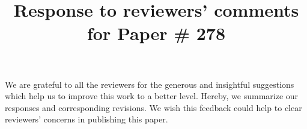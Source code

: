 \documentclass{vldb}
\begin{document}
\title{Response to reviewers' comments for Paper \# 278}
\maketitle

We are grateful to all the reviewers for the generous and insightful
suggestions which help us to improve this work to a better level. Hereby, 
we summarize our responses and corresponding revisions.
We wish this feedback could help to clear reviewers' concerns 
in publishing this paper.





\end{document}

